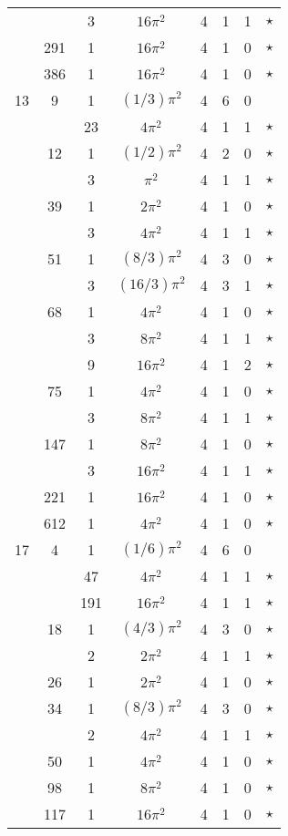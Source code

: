 \begin{tabular}{ccc|ccccc}
 &  & 3 & $16\pi^2$ & 4 & 1 & 1 & $\star$ \\
 & 291 & 1 & $16\pi^2$ & 4 & 1 & 0 & $\star$ \\
 & 386 & 1 & $16\pi^2$ & 4 & 1 & 0 & $\star$ \\
13 & 9 & 1 & $(1/3)\pi^2$ & 4 & 6 & 0 &  \\
 &  & 23 & $4\pi^2$ & 4 & 1 & 1 & $\star$ \\
 & 12 & 1 & $(1/2)\pi^2$ & 4 & 2 & 0 & $\star$ \\
 &  & 3 & $\pi^2$ & 4 & 1 & 1 & $\star$ \\
 & 39 & 1 & $2\pi^2$ & 4 & 1 & 0 & $\star$ \\
 &  & 3 & $4\pi^2$ & 4 & 1 & 1 & $\star$ \\
 & 51 & 1 & $(8/3)\pi^2$ & 4 & 3 & 0 & $\star$ \\
 &  & 3 & $(16/3)\pi^2$ & 4 & 3 & 1 & $\star$ \\
 & 68 & 1 & $4\pi^2$ & 4 & 1 & 0 & $\star$ \\
 &  & 3 & $8\pi^2$ & 4 & 1 & 1 & $\star$ \\
 &  & 9 & $16\pi^2$ & 4 & 1 & 2 & $\star$ \\
 & 75 & 1 & $4\pi^2$ & 4 & 1 & 0 & $\star$ \\
 &  & 3 & $8\pi^2$ & 4 & 1 & 1 & $\star$ \\
 & 147 & 1 & $8\pi^2$ & 4 & 1 & 0 & $\star$ \\
 &  & 3 & $16\pi^2$ & 4 & 1 & 1 & $\star$ \\
 & 221 & 1 & $16\pi^2$ & 4 & 1 & 0 & $\star$ \\
 & 612 & 1 & $4\pi^2$ & 4 & 1 & 0 & $\star$ \\
17 & 4 & 1 & $(1/6)\pi^2$ & 4 & 6 & 0 &  \\
 &  & 47 & $4\pi^2$ & 4 & 1 & 1 & $\star$ \\
 &  & 191 & $16\pi^2$ & 4 & 1 & 1 & $\star$ \\
 & 18 & 1 & $(4/3)\pi^2$ & 4 & 3 & 0 & $\star$ \\
 &  & 2 & $2\pi^2$ & 4 & 1 & 1 & $\star$ \\
 & 26 & 1 & $2\pi^2$ & 4 & 1 & 0 & $\star$ \\
 & 34 & 1 & $(8/3)\pi^2$ & 4 & 3 & 0 & $\star$ \\
 &  & 2 & $4\pi^2$ & 4 & 1 & 1 & $\star$ \\
 & 50 & 1 & $4\pi^2$ & 4 & 1 & 0 & $\star$ \\
 & 98 & 1 & $8\pi^2$ & 4 & 1 & 0 & $\star$ \\
 & 117 & 1 & $16\pi^2$ & 4 & 1 & 0 & $\star$ \\

\end{tabular}
